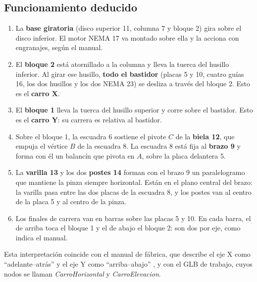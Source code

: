 \documentclass[a4paper,12pt]{article}
\begin{document}
\subsection{Funcionamiento deducido}
\begin{enumerate}
\item La \textbf{base giratoria} (disco superior 11, columna 7 y bloque 2) gira sobre el disco inferior. El
      motor NEMA 17 va montado sobre ella y la acciona con engranajes, según el manual.
\item El \textbf{bloque 2} está atornillado a la columna y lleva la tuerca del husillo inferior. Al girar
      ese husillo, \textbf{todo el bastidor} (placas 5 y 10, cuatro guías 16, los dos husillos y los dos NEMA 23)
      se desliza a través del bloque 2. Esto es el \textbf{carro X}.
\item El \textbf{bloque 1} lleva la tuerca del husillo superior y corre sobre el bastidor. Esto es el
      \textbf{carro Y}: su carrera es relativa al bastidor.
\item Sobre el bloque 1, la escuadra 6 sostiene el pivote $C$ de la \textbf{biela 12}, que empuja el vértice
      $B$ de la escuadra 8. La escuadra 8 está fija al \textbf{brazo 9} y forma con él un balancín que
      pivota en $A$, sobre la placa delantera 5.
\item La \textbf{varilla 13} y los dos \textbf{postes 14} forman con el brazo 9 un paralelogramo que mantiene
      la pinza siempre horizontal. Están en el plano central del brazo: la varilla pasa entre las dos placas
      de la escuadra 8, y los postes van al centro de la placa 5 y al centro de la pinza.
\item Los finales de carrera van en barras sobre las placas 5 y 10. En cada barra, el de arriba toca el
      bloque 1 y el de abajo el bloque 2: son dos por eje, como indica el manual.
\end{enumerate}
Esta interpretación coincide con el manual de fábrica, que describe el eje X como ``adelante--atrás'' y el
eje Y como ``arriba--abajo'' \cite{manual}, y con el GLB de trabajo, cuyos nodos se llaman
\emph{CarroHorizontal} y \emph{CarroElevacion}.
\end{document}
